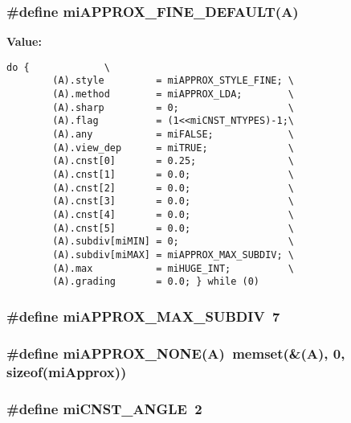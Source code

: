 \subsubsection{\setlength{\rightskip}{0pt plus 5cm}\#define mi\-APPROX\_\-FINE\_\-DEFAULT(A)}\label{shader_8h_a74}


{\bf Value:}

\footnotesize\begin{verbatim}do {             \
        (A).style         = miAPPROX_STYLE_FINE; \
        (A).method        = miAPPROX_LDA;        \
        (A).sharp         = 0;                   \
        (A).flag          = (1<<miCNST_NTYPES)-1;\
        (A).any           = miFALSE;             \
        (A).view_dep      = miTRUE;              \
        (A).cnst[0]       = 0.25;                \
        (A).cnst[1]       = 0.0;                 \
        (A).cnst[2]       = 0.0;                 \
        (A).cnst[3]       = 0.0;                 \
        (A).cnst[4]       = 0.0;                 \
        (A).cnst[5]       = 0.0;                 \
        (A).subdiv[miMIN] = 0;                   \
        (A).subdiv[miMAX] = miAPPROX_MAX_SUBDIV; \
        (A).max           = miHUGE_INT;          \
        (A).grading       = 0.0; } while (0)
\end{verbatim}\normalsize 
{}
\subsubsection{\setlength{\rightskip}{0pt plus 5cm}\#define mi\-APPROX\_\-MAX\_\-SUBDIV\ 7}\label{shader_8h_a71}


\subsubsection{\setlength{\rightskip}{0pt plus 5cm}\#define mi\-APPROX\_\-NONE(A)\ memset(\&(A), 0, sizeof({\bf mi\-Approx}))}\label{shader_8h_a72}


\subsubsection{\setlength{\rightskip}{0pt plus 5cm}\#define mi\-CNST\_\-ANGLE\ 2}\label{shader_8h_a70}


